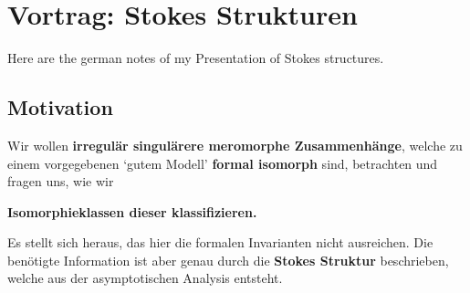 \chapter{Vortrag: Stokes Strukturen}
Here are the german notes of my Presentation of Stokes structures.
\setcounter{section}{-1} \section{Motivation} %
Wir wollen \textbf{irregulär singulärere meromorphe Zusammenhänge}, welche zu
einem vorgegebenen `gutem Modell' \textbf{formal isomorph} sind, betrachten und
fragen uns, wie wir
\begin{center}
  \textbf{Isomorphieklassen dieser klassifizieren.}
\end{center}

Es stellt sich heraus, das hier die formalen Invarianten nicht ausreichen.
Die benötigte Information ist aber genau durch die \textbf{Stokes Struktur}
beschrieben, welche aus der asymptotischen Analysis entsteht.
